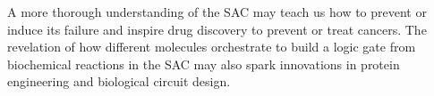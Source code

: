 


A more thorough understanding of the SAC may teach us how to prevent or induce its failure and inspire drug discovery to prevent or treat cancers. The revelation of how different molecules orchestrate to build a  logic gate from biochemical reactions in the SAC may also spark innovations in protein engineering and biological circuit design.